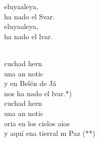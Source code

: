 \begin{cancion}%
	\begin{chorus}%
	eluyaaleya,\\
	ha nado el Svar.\\
	eluyaaleya,\\
	ha nado el lvar.\\
	\end{chorus}%
	\jump\\
	cuchad hern\\
	una an notic \\
	y en Belén de Já\\
	nos ha nado el lvar.*)\\
	cuchad hern\\
	una an notic  \\
	oria en los cielos aios\\
	y aquí ena tierral m Paz (**)\\
\end{cancion}%
